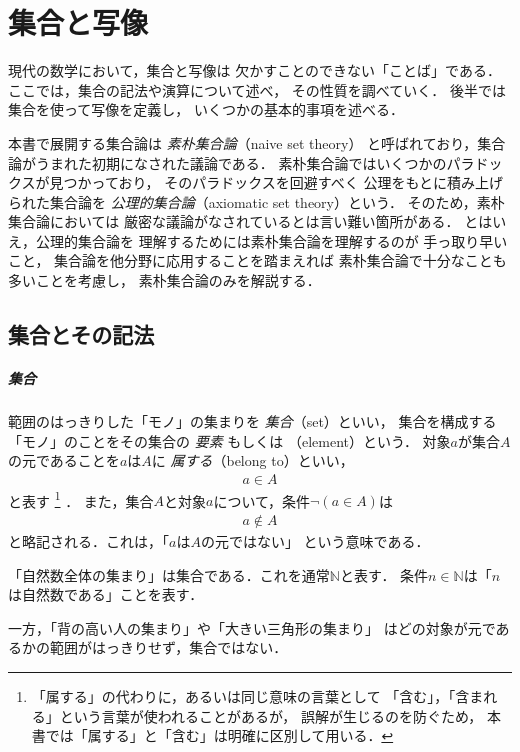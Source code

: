 \chapter{集合と写像}
\label{chp:set}
 現代の数学において，集合と写像は
 欠かすことのできない「ことば」である．
 ここでは，集合の記法や演算について述べ，
 その性質を調べていく．
 後半では集合を使って写像を定義し，
 いくつかの基本的事項を述べる．

 本書で展開する集合論は
 {}
 \emph{素朴集合論}（naive set theory）
 と呼ばれており，集合論がうまれた初期になされた議論である．
 素朴集合論ではいくつかのパラドックスが見つかっており，
 そのパラドックスを回避すべく
 公理をもとに積み上げられた集合論を
 \emph{公理的集合論}（axiomatic set theory）という．
 そのため，素朴集合論においては
 厳密な議論がなされているとは言い難い箇所がある．
 とはいえ，公理的集合論を
 理解するためには素朴集合論を理解するのが
 手っ取り早いこと，
 集合論を他分野に応用することを踏まえれば
 素朴集合論で十分なことも多いことを考慮し，
 素朴集合論のみを解説する．
%
%
%
%
%
 \section{集合とその記法}
 \label{sec:set}
 \paragraph{集合}
 範囲のはっきりした「モノ」の集まりを
 \emph{集合}（set）といい，
 集合を構成する「モノ」のことをその集合の
 \emph{要素} もしくは
 \emph{}（element）という．
 対象$a$が集合$A$の元であることを$a$は$A$に
 \emph{属する}（belong to）といい，
 \begin{align}
   a \in A
   \label{eq:setelement}
 \end{align}
 と表す
 \footnote{「属する」の代わりに，あるいは同じ意味の言葉として
           「含む」，「含まれる」という言葉が使われることがあるが，
            誤解が生じるのを防ぐため，
            本書では「属する」と「含む」は明確に区別して用いる．}
 ．
 また，集合$A$と対象$a$について，条件$\lnot (a  \in A)$は
 \begin{align}
   a \notin A
   \label{eq:setelementnot}
 \end{align}
 と略記される．これは，「$a$は$A$の元ではない」
 という意味である．
 \begin{ex} \label{ex:setrei}
   「自然数全体の集まり」は集合である．これを通常$\mathbb{N}$と表す．
   条件$n \in \mathbb{N}$は「$n$は自然数である」ことを表す．

   一方，「背の高い人の集まり」や「大きい三角形の集まり」
   はどの対象が元であるかの範囲がはっきりせず，集合ではない．
 \end{ex}

